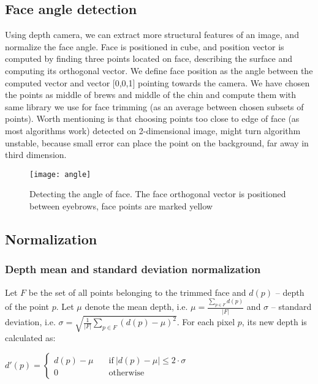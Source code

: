    \subsection{Face angle detection}
    \label{sec:angledetection}
    Using depth camera, we can extract more structural features of an image,
    and normalize the face angle. Face is positioned in cube, and position vector is computed
    by finding three points located on face, describing the surface
    and computing its orthogonal vector. We define face position
    as the angle between the computed vector and vector [0,0,1] pointing towards the camera.
    We have chosen the points as middle of brews and middle of the chin and compute them with
    same library we use for face trimming (as an average between chosen subsets of points). Worth
    mentioning is that choosing points too close to edge of face (as most algorithms work)
    detected on 2-dimensional image, might turn algorithm unstable, because small error can place the point on the background,
    far away in third dimension.


    \begin{figure}[H]
    \caption{Detecting the angle of face. The face orthogonal vector is positioned between eyebrows, face points are marked yellow}
    \centering
    \texttt{[image: angle]}
    \end{figure}


    \subsection{Normalization}
        \subsubsection*{Depth mean and standard deviation normalization}
        Let $F$ be the set of all points belonging to the trimmed face and
        $d(p)$ -- depth of the point $p$. Let $\mu$ denote the mean depth, i.e.
        $\mu = \frac{\sum\limits_{p \in F}{d(p)}}{|F|}$ and $\sigma$ -- standard
        deviation, i.e. $\sigma = \sqrt{\frac{1}{|F|} \sum\limits_{p \in F}{(d(p) - \mu)^2}}$.
        For each pixel $p$, its new depth is calculated as:

        \begin{center}
        $
          d'(p) = \begin{cases}
                  d(p) - \mu &\quad\text{if}\ |d(p) - \mu| \leqslant 2 \cdot \sigma \\
                  0 &\quad\text{otherwise}
                  \end{cases}
        $
        \end{center}


